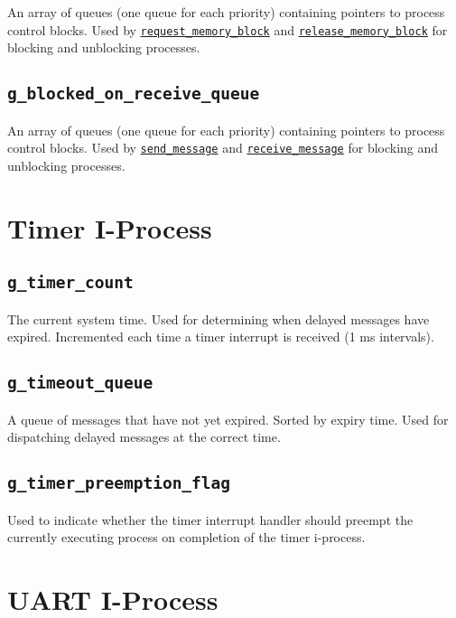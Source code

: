 \documentclass[12pt]{report}
\begin{document}
An array of queues (one queue for each priority) containing pointers to process control blocks. Used by \hyperref[alg:requestingmemoryblocks]{\texttt{request_memory_block}} and \hyperref[alg:releasingmemoryblocks]{\texttt{release_memory_block}} for blocking and unblocking processes.

\subsection{\texttt{g_blocked_on_receive_queue}}

An array of queues (one queue for each priority) containing pointers to process control blocks. Used by \hyperref[alg:sendingmessages]{\texttt{send_message}} and \hyperref[alg:receivingmessages]{\texttt{receive_message}} for blocking and unblocking processes.

\section{Timer I-Process}

\subsection{\texttt{g_timer_count}}
\label{app:gtimercount}

The current system time. Used for determining when delayed messages have expired. Incremented each time a timer interrupt is received (1 ms intervals).

\subsection{\texttt{g_timeout_queue}}
\label{app:gtimeoutqueue}

A queue of messages that have not yet expired. Sorted by expiry time. Used for dispatching delayed messages at the correct time.

\subsection{\texttt{g_timer_preemption_flag}}

Used to indicate whether the timer interrupt handler should preempt the currently executing process on completion of the timer i-process.

\section{UART I-Process}
\label{app:uartglobals}
\end{document}
